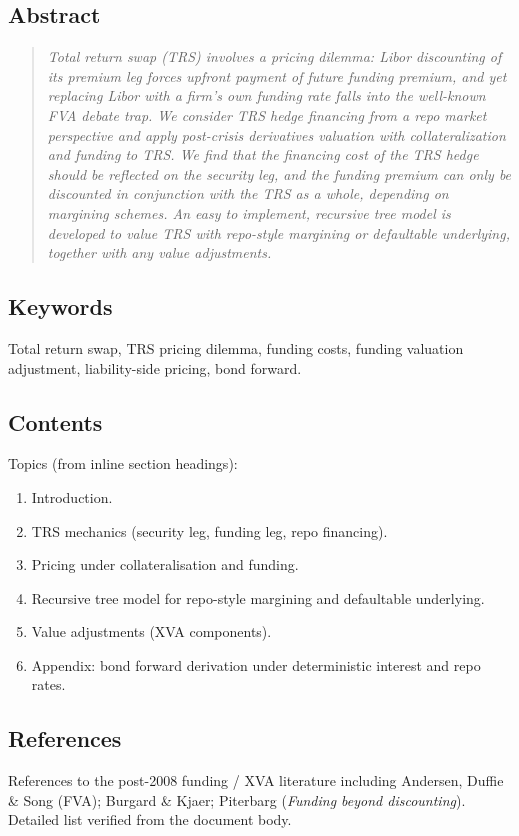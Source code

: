 \documentclass[11pt,a4paper]{article}
\begin{document}
\subsection*{Abstract}
\begin{quote}\itshape
Total return swap (TRS) involves a pricing dilemma: Libor discounting
of its premium leg forces upfront payment of future funding premium,
and yet replacing Libor with a firm's own funding rate falls into the
well-known FVA debate trap. We consider TRS hedge financing from a
repo market perspective and apply post-crisis derivatives valuation
with collateralization and funding to TRS. We find that the financing
cost of the TRS hedge should be reflected on the security leg, and
the funding premium can only be discounted in conjunction with the
TRS as a whole, depending on margining schemes. An easy to implement,
recursive tree model is developed to value TRS with repo-style
margining or defaultable underlying, together with any value
adjustments.
\end{quote}

\subsection*{Keywords}
Total return swap, TRS pricing dilemma, funding costs, funding
valuation adjustment, liability-side pricing, bond forward.

\subsection*{Contents}
Topics (from inline section headings):
\begin{enumerate}[noitemsep]
  \item Introduction.
  \item TRS mechanics (security leg, funding leg, repo financing).
  \item Pricing under collateralisation and funding.
  \item Recursive tree model for repo-style margining and defaultable underlying.
  \item Value adjustments (XVA components).
  \item Appendix: bond forward derivation under deterministic interest and repo rates.
\end{enumerate}

\subsection*{References}
References to the post-2008 funding / XVA literature including
Andersen, Duffie \& Song (FVA); Burgard \& Kjaer; Piterbarg
(\emph{Funding beyond discounting}). Detailed list verified from
the document body.
\end{document}
